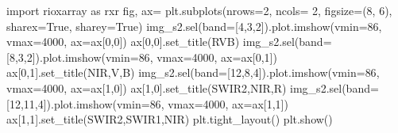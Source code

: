 \documentclass[
  11pt,
  letterpaper,
  open=any,
  twoside=false,
  french]{scrbook}
\newenvironment{Shaded}{\begin{snugshade}}{\end{snugshade}}
\newcommand{\DecValTok}[1]{\textcolor[rgb]{0.68,0.00,0.00}{#1}}
\newcommand{\ImportTok}[1]{\textcolor[rgb]{0.00,0.46,0.62}{#1}}
\newcommand{\NormalTok}[1]{\textcolor[rgb]{0.00,0.23,0.31}{#1}}
\newcommand{\OperatorTok}[1]{\textcolor[rgb]{0.37,0.37,0.37}{#1}}
\newcommand{\StringTok}[1]{\textcolor[rgb]{0.13,0.47,0.30}{#1}}
\newcommand{\VariableTok}[1]{\textcolor[rgb]{0.07,0.07,0.07}{#1}}
\begin{document}
\begin{Shaded}
\begin{Highlighting}[]
\ImportTok{import}\NormalTok{ rioxarray }\ImportTok{as}\NormalTok{ rxr}
\NormalTok{fig, ax}\OperatorTok{=}\NormalTok{ plt.subplots(nrows}\OperatorTok{=}\DecValTok{2}\NormalTok{, ncols}\OperatorTok{=} \DecValTok{2}\NormalTok{, figsize}\OperatorTok{=}\NormalTok{(}\DecValTok{8}\NormalTok{, }\DecValTok{6}\NormalTok{), sharex}\OperatorTok{=}\VariableTok{True}\NormalTok{, sharey}\OperatorTok{=}\VariableTok{True}\NormalTok{)}
\NormalTok{img\_s2.sel(band}\OperatorTok{=}\NormalTok{[}\DecValTok{4}\NormalTok{,}\DecValTok{3}\NormalTok{,}\DecValTok{2}\NormalTok{]).plot.imshow(vmin}\OperatorTok{=}\DecValTok{86}\NormalTok{, vmax}\OperatorTok{=}\DecValTok{4000}\NormalTok{, ax}\OperatorTok{=}\NormalTok{ax[}\DecValTok{0}\NormalTok{,}\DecValTok{0}\NormalTok{])}
\NormalTok{ax[}\DecValTok{0}\NormalTok{,}\DecValTok{0}\NormalTok{].set\_title(}\StringTok{\textquotesingle{}RVB\textquotesingle{}}\NormalTok{)}
\NormalTok{img\_s2.sel(band}\OperatorTok{=}\NormalTok{[}\DecValTok{8}\NormalTok{,}\DecValTok{3}\NormalTok{,}\DecValTok{2}\NormalTok{]).plot.imshow(vmin}\OperatorTok{=}\DecValTok{86}\NormalTok{, vmax}\OperatorTok{=}\DecValTok{4000}\NormalTok{, ax}\OperatorTok{=}\NormalTok{ax[}\DecValTok{0}\NormalTok{,}\DecValTok{1}\NormalTok{])}
\NormalTok{ax[}\DecValTok{0}\NormalTok{,}\DecValTok{1}\NormalTok{].set\_title(}\StringTok{\textquotesingle{}NIR,V,B\textquotesingle{}}\NormalTok{)}
\NormalTok{img\_s2.sel(band}\OperatorTok{=}\NormalTok{[}\DecValTok{12}\NormalTok{,}\DecValTok{8}\NormalTok{,}\DecValTok{4}\NormalTok{]).plot.imshow(vmin}\OperatorTok{=}\DecValTok{86}\NormalTok{, vmax}\OperatorTok{=}\DecValTok{4000}\NormalTok{, ax}\OperatorTok{=}\NormalTok{ax[}\DecValTok{1}\NormalTok{,}\DecValTok{0}\NormalTok{])}
\NormalTok{ax[}\DecValTok{1}\NormalTok{,}\DecValTok{0}\NormalTok{].set\_title(}\StringTok{\textquotesingle{}SWIR2,NIR,R\textquotesingle{}}\NormalTok{)}
\NormalTok{img\_s2.sel(band}\OperatorTok{=}\NormalTok{[}\DecValTok{12}\NormalTok{,}\DecValTok{11}\NormalTok{,}\DecValTok{4}\NormalTok{]).plot.imshow(vmin}\OperatorTok{=}\DecValTok{86}\NormalTok{, vmax}\OperatorTok{=}\DecValTok{4000}\NormalTok{, ax}\OperatorTok{=}\NormalTok{ax[}\DecValTok{1}\NormalTok{,}\DecValTok{1}\NormalTok{])}
\NormalTok{ax[}\DecValTok{1}\NormalTok{,}\DecValTok{1}\NormalTok{].set\_title(}\StringTok{\textquotesingle{}SWIR2,SWIR1,NIR\textquotesingle{}}\NormalTok{)}
\NormalTok{plt.tight\_layout()}
\NormalTok{plt.show()}
\end{Highlighting}
\end{Shaded}
\end{document}
